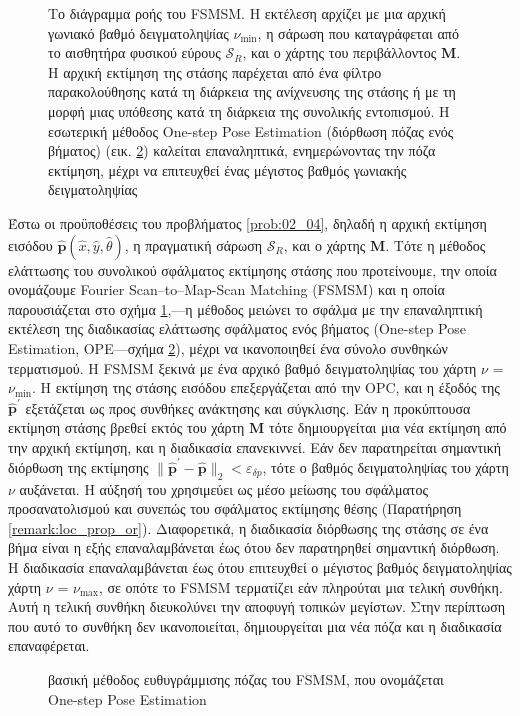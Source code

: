 \begin{figure}[!h]\centering
  
  \caption{\small Το διάγραμμα ροής του FSMSM. Η εκτέλεση αρχίζει με μια αρχική
           γωνιακό βαθμό δειγματοληψίας $\nu_{\min}$, η σάρωση που καταγράφεται
           από το αισθητήρα φυσικού εύρους $\mathcal{S}_R$, και ο χάρτης του
           περιβάλλοντος $\bm{M}$. Η αρχική εκτίμηση της στάσης παρέχεται από
           ένα φίλτρο παρακολούθησης κατά τη διάρκεια της ανίχνευσης της στάσης
           ή με τη μορφή μιας υπόθεσης κατά τη διάρκεια της συνολικής
           εντοπισμού. Η εσωτερική μέθοδος One-step Pose Estimation (διόρθωση
           πόζας ενός βήματος) (εικ. \ref{fig:02_04_04:inner_system}) καλείται
           επαναληπτικά, ενημερώνοντας την πόζα εκτίμηση, μέχρι να επιτευχθεί
           ένας μέγιστος βαθμός γωνιακής δειγματοληψίας}
  \label{fig:02_04_04:outer_system}
\end{figure}

Έστω οι προϋποθέσεις του προβλήματος \ref{prob:02_04}, δηλαδή
η αρχική εκτίμηση εισόδου $\hat{\bm{p}}(\hat{x}, \hat{y}, \hat{\theta})$,
η πραγματική σάρωση $\mathcal{S}_R$, και ο χάρτης $\bm{M}$. Τότε
η μέθοδος ελάττωσης του συνολικού σφάλματος εκτίμησης στάσης που προτείνουμε,
την οποία ονομάζουμε Fourier Scan--to--Map-Scan Matching (FSMSM) και η οποία
παρουσιάζεται στο σχήμα \ref{fig:02_04_04:outer_system},---η μέθοδος μειώνει το
σφάλμα με την επαναληπτική εκτέλεση της διαδικασίας ελάττωσης σφάλματος ενός
βήματος (One-step Pose Estimation, OPE---σχήμα \ref{fig:02_04_04:inner_system}),
μέχρι να ικανοποιηθεί ένα σύνολο συνθηκών τερματισμού. Η FSMSM ξεκινά με ένα
αρχικό βαθμό δειγματοληψίας του χάρτη $\nu$ = $\nu_{\min}$. Η εκτίμηση της
στάσης εισόδου επεξεργάζεται από την OPC, και η έξοδός της
$\hat{\bm{p}}^\prime$ εξετάζεται ως προς συνθήκες ανάκτησης και
σύγκλισης. Εάν η προκύπτουσα εκτίμηση στάσης βρεθεί εκτός του χάρτη $\bm{M}$
τότε δημιουργείται μια νέα εκτίμηση από την αρχική
εκτίμηση, και η διαδικασία επανεκιννεί. Εάν δεν παρατηρείται σημαντική
διόρθωση της εκτίμησης
$\|\hat{\bm{p}}^\prime-\hat{\bm{p}}\|_2 < \varepsilon_{\delta p}$, τότε ο
βαθμός δειγματοληψίας του χάρτη $\nu$ αυξάνεται. Η αύξησή του χρησιμεύει ως
μέσο μείωσης του σφάλματος προσανατολισμού και συνεπώς του σφάλματος εκτίμησης
θέσης (Παρατήρηση \ref{remark:loc_prop_or}). Διαφορετικά, η διαδικασία
διόρθωσης της στάσης σε ένα βήμα είναι η εξής επαναλαμβάνεται έως ότου δεν
παρατηρηθεί σημαντική διόρθωση. Η διαδικασία επαναλαμβάνεται έως ότου
επιτευχθεί ο μέγιστος βαθμός δειγματοληψίας χάρτη $\nu$ = $\nu_{\max}$, σε
οπότε το FSMSM τερματίζει εάν πληρούται μια τελική συνθήκη. Αυτή η τελική
συνθήκη διευκολύνει την αποφυγή τοπικών μεγίστων. Στην περίπτωση που αυτό το
συνθήκη δεν ικανοποιείται, δημιουργείται μια νέα πόζα και η διαδικασία
επαναφέρεται.

\begin{figure}[!h]\centering
  
  \caption{\small  βασική μέθοδος ευθυγράμμισης πόζας του FSMSM, που ονομάζεται
           One-step Pose Estimation}
  \label{fig:02_04_04:inner_system}
\end{figure}
